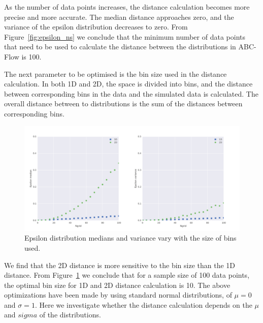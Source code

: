 As the number of data points increases, the distance calculation becomes more precise and more accurate. The median distance approaches zero, and the variance of the epsilon distribution decreases to zero. From Figure~\ref{fig:epsilon_ns} we conclude that the minimum number of data points  that need to be used to calculate the distance between the distributions in ABC-Flow is 100.  

The next parameter to be optimised is the bin size used in the distance calculation. In both 1D and 2D, the space is divided into bins, and the distance between corresponding bins in the data and the simulated data is calculated. The overall distance between to distributions is the sum of the distances between corresponding bins. %


\begin{figure}[htbp]
\centering
\includegraphics[scale=0.5]{chapterABCFlow/images/ngrid.png}
\caption{Epsilon distribution medians and variance vary with the size of bins used. }
\label{fig:epsilon_ngrid}
\end{figure}


We find that the 2D distance is more sensitive to the bin size than the 1D distance. From Figure~\ref{fig:epsilon_ngrid} we conclude that for a sample size of 100 data points, the optimal bin size for 1D and 2D distance calculation is 10. The above optimizations have been made by using standard normal distributions, of $\mu=0$ and $\sigma=1$. Here we investigate whether the distance calculation depends on the $\mu$ and $sigma$ of the distributions. 

